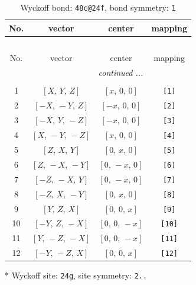 \documentclass[fleqn,8pt]{jsarticle}
\begin{document}
\begin{longtable}{cccc}
\caption{Wyckoff bond: {\tt 48c@24f}, bond symmetry: {\tt 1}}
 \\
 \hline \hline
No. & vector & center & mapping \\ \hline \endfirsthead

\multicolumn{3}{l}{\tablename\ \thetable{}} \\
 \hline \hline
No. & vector & center & mapping \\ \hline \endhead

 \hline \hline
\multicolumn{3}{r}{\footnotesize\it continued ...} \\ \endfoot

 \hline \hline
\multicolumn{3}{r}{} \\ \endlastfoot

1 & $\left[ X,\, Y,\, Z \right]$ & $\left[ x,\, 0,\, 0 \right]$ & {\tt [1]} \\ \hline
2 & $\left[ - X,\, - Y,\, Z \right]$ & $\left[ - x,\, 0,\, 0 \right]$ & {\tt [2]} \\ \hline
3 & $\left[ - X,\, Y,\, - Z \right]$ & $\left[ - x,\, 0,\, 0 \right]$ & {\tt [3]} \\ \hline
4 & $\left[ X,\, - Y,\, - Z \right]$ & $\left[ x,\, 0,\, 0 \right]$ & {\tt [4]} \\ \hline
5 & $\left[ Z,\, X,\, Y \right]$ & $\left[ 0,\, x,\, 0 \right]$ & {\tt [5]} \\ \hline
6 & $\left[ Z,\, - X,\, - Y \right]$ & $\left[ 0,\, - x,\, 0 \right]$ & {\tt [6]} \\ \hline
7 & $\left[ - Z,\, - X,\, Y \right]$ & $\left[ 0,\, - x,\, 0 \right]$ & {\tt [7]} \\ \hline
8 & $\left[ - Z,\, X,\, - Y \right]$ & $\left[ 0,\, x,\, 0 \right]$ & {\tt [8]} \\ \hline
9 & $\left[ Y,\, Z,\, X \right]$ & $\left[ 0,\, 0,\, x \right]$ & {\tt [9]} \\ \hline
10 & $\left[ - Y,\, Z,\, - X \right]$ & $\left[ 0,\, 0,\, - x \right]$ & {\tt [10]} \\ \hline
11 & $\left[ Y,\, - Z,\, - X \right]$ & $\left[ 0,\, 0,\, - x \right]$ & {\tt [11]} \\ \hline
12 & $\left[ - Y,\, - Z,\, X \right]$ & $\left[ 0,\, 0,\, x \right]$ & {\tt [12]} \\
\end{longtable}
* Wyckoff site: {\tt 24g}, site symmetry: {\tt 2..}
\renewcommand{\arraystretch}{1.2}
\end{document}
